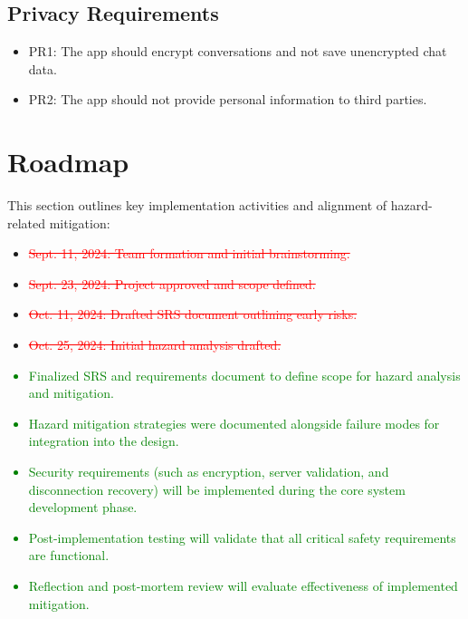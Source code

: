 \documentclass[12pt]{article}
\newcommand{\removed}[1]{\textcolor{red}{\sout{#1}}}
\newcommand{\added}[1]{\textcolor{green}{#1}}
\begin{document}
\subsection{Privacy Requirements}
\begin{itemize}
    \item PR1: The app should encrypt conversations and not save unencrypted chat data.
    \item PR2: The app should not provide personal information to third parties.
\end{itemize}

\section{Roadmap}
This section outlines key implementation activities and alignment of hazard-related mitigation:
    \begin{itemize}
        \item \removed{ Sept. 11, 2024: Team formation and initial brainstorming.}
        \item \removed{ Sept. 23, 2024: Project approved and scope defined.}
        \item \removed{Oct. 11, 2024: Drafted SRS document outlining early risks.}
        \item \removed{Oct. 25, 2024: Initial hazard analysis drafted.}
    \end{itemize}

\added{
\begin{itemize}
    \item Finalized SRS and requirements document to define scope for hazard analysis and mitigation.
    \item Hazard mitigation strategies were documented alongside failure modes for integration into the design.
    \item Security requirements (such as encryption, server validation, and disconnection recovery) will be implemented during the core system development phase.
    \item Post-implementation testing will validate that all critical safety requirements are functional.
    \item Reflection and post-mortem review will evaluate effectiveness of implemented mitigation.
\end{itemize}}

\newpage
\end{document}
